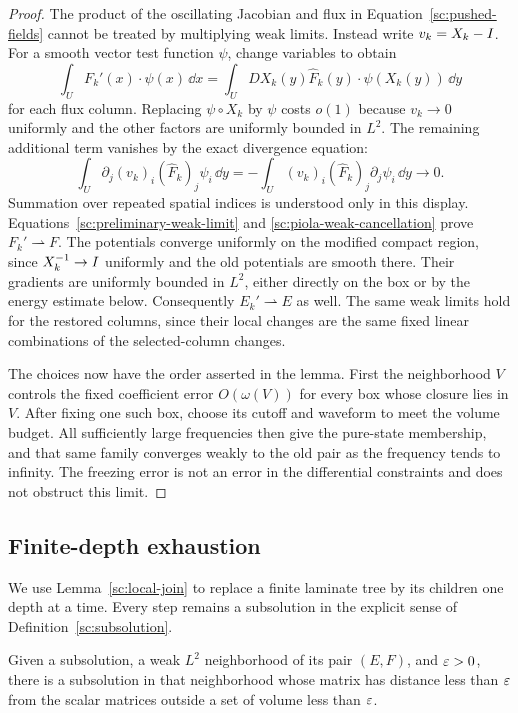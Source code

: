\begin{proof}
The product of the oscillating Jacobian and flux in
Equation~\eqref{sc:pushed-fields} cannot be treated by multiplying
weak limits. Instead write $v_k=X_k-I$. For a smooth vector
test function $\psi$, change variables to obtain
\[
 \int_U F_k'(x)\cdot\psi(x)\,\dd x
 =\int_U DX_k(y)\widehat F_k(y)\cdot\psi(X_k(y))\,\dd y
\]
for each flux column. Replacing $\psi\circ X_k$ by $\psi$
costs $o(1)$ because $v_k\to0$ uniformly and the other factors
are uniformly bounded in $L^2$. The remaining additional term
vanishes by the exact divergence equation:
\begin{equation}
 \label{sc:piola-weak-cancellation}
 \int_U\partial_j(v_k)_i(\widehat F_k)_j\psi_i\,\dd y
 =-\int_U(v_k)_i(\widehat F_k)_j\partial_j\psi_i\,\dd y
 \longrightarrow0.
\end{equation}
Summation over repeated spatial indices is understood only in this
display. Equations~\eqref{sc:preliminary-weak-limit} and
\eqref{sc:piola-weak-cancellation} prove $F_k'\rightharpoonup F$.
The potentials converge uniformly on the modified compact region,
since $X_k^{-1}\to I$ uniformly and the old potentials are
smooth there. Their gradients are uniformly bounded in $L^2$,
either directly on the box or by the energy estimate below.
Consequently $E_k'\rightharpoonup E$ as well. The same weak limits hold
for the restored columns, since their local changes are the same fixed
linear combinations of the selected-column changes.

The choices now have the order asserted in the lemma. First the
neighborhood $V$ controls the fixed coefficient error $O(\omega(V))$
for every box whose closure lies in $V$. After fixing one such box,
choose its cutoff and waveform to meet the volume budget. All
sufficiently large frequencies then give the pure-state membership,
and that same family converges weakly to the old pair as the frequency
tends to infinity. The freezing error is not an error in the
differential constraints and does not obstruct this limit.
\end{proof}

\subsection{Finite-depth exhaustion}

We use Lemma~\ref{sc:local-join} to replace a finite laminate tree by
its children one depth at a time. Every step remains a subsolution in
the explicit sense of Definition~\ref{sc:subsolution}.

\begin{proposition}
\label{sc:weak-approximation}
Given a subsolution, a weak $L^2$ neighborhood of its pair $(E,F)$,
and $\varepsilon>0$, there is a subsolution in that neighborhood whose
matrix has distance less than $\varepsilon$ from the scalar matrices
outside a set of volume less than $\varepsilon$.
\end{proposition}

